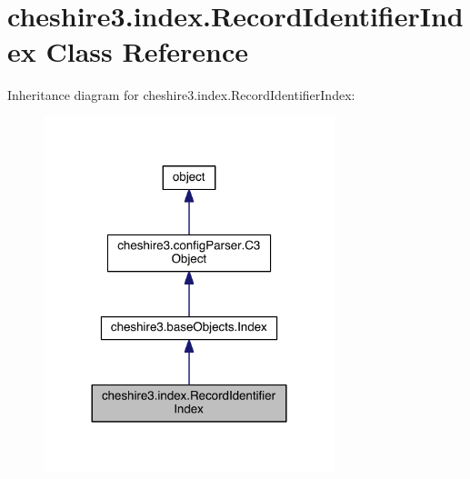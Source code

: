 \hypertarget{classcheshire3_1_1index_1_1_record_identifier_index}{\section{cheshire3.\-index.\-Record\-Identifier\-Index Class Reference}
\label{classcheshire3_1_1index_1_1_record_identifier_index}
}


Inheritance diagram for cheshire3.\-index.\-Record\-Identifier\-Index\-:
\nopagebreak
\begin{figure}[H]
\begin{center}
\leavevmode
\includegraphics[width=240pt]{classcheshire3_1_1index_1_1_record_identifier_index__inherit__graph}
\end{center}
\end{figure}



